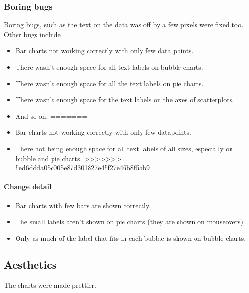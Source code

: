   \subsubsection{Boring bugs}
  Boring bugs, such as the text on the data was off by a few pixels were fixed too.
  Other bugs include 
  \begin{itemize}
<<<<<<< HEAD
  	\item Bar charts not working correctly with only few data points.
  	\item There wasn't enough space for all text labels on bubble charts.
  	\item There wasn't enough space for all the text labels on pie charts.
  	\item There wasn't enough space for the text labels on the axes of scatterplots.
  	\item And so on.
=======
  	\item Bar charts not working correctly with only few datapoints.
  	\item There not being enough space for all text labels of all sizes, especially on bubble and pie charts.
>>>>>>> 5ed6ddda05c005e87d301827e45f27e46b8f5ab9
  \end{itemize}
  
  \paragraph{Change detail}
  \begin{itemize}
  	\item Bar charts with few bars are shown correctly. 
  	\item The small labels aren't shown on pie charts (they are shown on mouseovers)
  	\item Only as much of the label that fits in each bubble is shown on bubble charts.
\end{itemize}
  


\subsection{Aesthetics}
The charts were made prettier.
  
